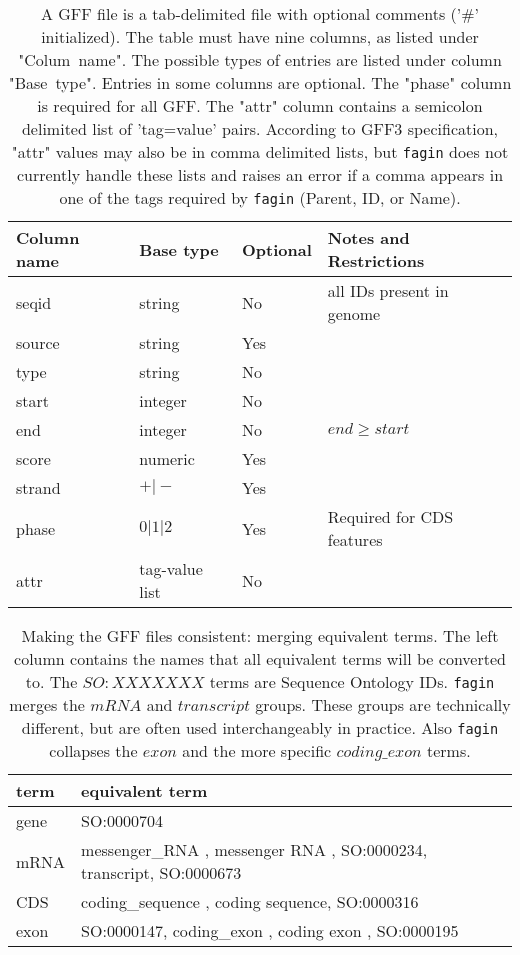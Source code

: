 \begin{table}[htpb]
  \centering
  \caption{A GFF file is a tab-delimited file with optional comments ('\#'
  initialized). The table must have nine columns, as listed under "Colum~name".
  The possible types of entries are listed under column "Base~type".  Entries
  in some columns are optional. The "phase" column is required for all GFF. The
  "attr" column contains a semicolon delimited list of 'tag=value' pairs.
  According to GFF3 specification, "attr" values may also be in comma delimited
  lists, but {\tt fagin} does not currently handle these lists and raises an
  error if a comma appears in one of the tags required by {\tt fagin} (Parent,
  ID, or Name).}
  \label{tab:gff-types}
  \begin{tabular}{llll}
    Column name & Base type & Optional & Notes and Restrictions \\
    \hline
    seqid  & string               & No  & all IDs present in genome \\
    source & string               & Yes & {}                        \\
    type   & string               & No  & {}                        \\
    start  & integer              & No  & {}                        \\
    end    & integer              & No  & $end \ge start$           \\
    score  & numeric              & Yes & {}                        \\
    strand & $+ \vert -$          & Yes & {}                        \\
    phase  & $0 \vert 1 \vert 2 $ & Yes & Required for CDS features \\
    attr   & tag-value list       & No  & {}                        \\
  \end{tabular}
\end{table}

\begin{table}[htpb]
  \centering
  \caption{Making the GFF files consistent: merging equivalent terms. The left
  column contains the names that all equivalent terms will be converted to. The
  $SO:XXXXXXX$ terms are Sequence Ontology IDs. {\tt fagin}  merges the $mRNA$
  and $transcript$ groups. These groups are technically different, but are
  often used interchangeably in practice. Also {\tt fagin} collapses the $exon$
  and the more specific $coding\_exon$ terms.}
  \label{tab:sequence-ontology}
  \begin{tabular}{ll}
    term & equivalent term \\
    \hline
    gene & SO:0000704 \\
    mRNA & messenger\_RNA , messenger RNA , SO:0000234, transcript, SO:0000673 \\
    CDS  & coding\_sequence , coding sequence, SO:0000316 \\
    exon & SO:0000147, coding\_exon , coding exon , SO:0000195
  \end{tabular}
\end{table}

